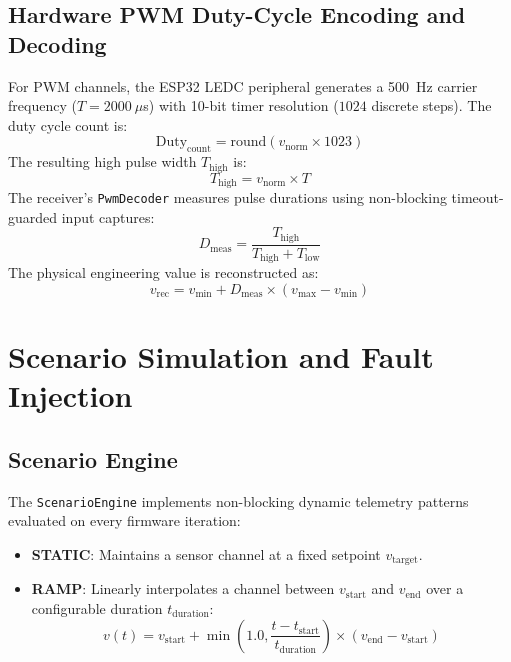 \documentclass[conference]{IEEEtran}
\begin{document}
\subsection{Hardware PWM Duty-Cycle Encoding and Decoding}
For PWM channels, the ESP32 LEDC peripheral generates a 500~Hz carrier frequency ($T = 2000~\mu$s) with 10-bit timer resolution ($1024$ discrete steps). The duty cycle count is:
\begin{equation}
\text{Duty}_{\text{count}} = \text{round}(v_{\text{norm}} \times 1023)
\end{equation}
The resulting high pulse width $T_{\text{high}}$ is:
\begin{equation}
T_{\text{high}} = v_{\text{norm}} \times T
\end{equation}
The receiver's \texttt{PwmDecoder} measures pulse durations using non-blocking timeout-guarded input captures:
\begin{equation}
D_{\text{meas}} = \frac{T_{\text{high}}}{T_{\text{high}} + T_{\text{low}}}
\end{equation}
The physical engineering value is reconstructed as:
\begin{equation}
v_{\text{rec}} = v_{\min} + D_{\text{meas}} \times (v_{\max} - v_{\min})
\end{equation}

\section{Scenario Simulation and Fault Injection}
\subsection{Scenario Engine}
The \texttt{ScenarioEngine} implements non-blocking dynamic telemetry patterns evaluated on every firmware iteration:
\begin{itemize}
    \item \textbf{STATIC}: Maintains a sensor channel at a fixed setpoint $v_{\text{target}}$.
    \item \textbf{RAMP}: Linearly interpolates a channel between $v_{\text{start}}$ and $v_{\text{end}}$ over a configurable duration $t_{\text{duration}}$:
    \begin{equation}
    v(t) = v_{\text{start}} + \min\left(1.0, \frac{t - t_{\text{start}}}{t_{\text{duration}}}\right) \times (v_{\text{end}} - v_{\text{start}})
    \end{equation}
\end{itemize}
\end{document}

